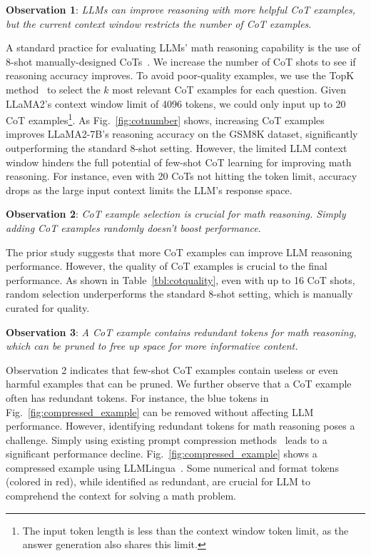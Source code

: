 \textbf{Observation 1}: \textit{LLMs can improve reasoning with more helpful CoT examples, but the current context window restricts the number of  CoT examples}.

A standard practice for evaluating LLMs' math reasoning capability is the use of 8-shot manually-designed CoTs~\cite{cot}. We increase the number of CoT shots to see if reasoning accuracy improves. To avoid poor-quality examples, we use the TopK method~\cite{topk} to select the $k$ most relevant CoT examples for each question. Given LLaMA2's context window limit of 4096 tokens, we could only input up to 20 CoT examples\footnote{The input token length is less than the context window token limit, as the answer generation also shares this limit. }. As Fig.~\ref{fig:cotnumber} shows, increasing CoT examples improves LLaMA2-7B's reasoning accuracy on the GSM8K dataset, significantly outperforming the standard 8-shot setting.  However, the limited LLM context window hinders the full potential of few-shot CoT learning for improving math reasoning. For instance, even with 20 CoTs not hitting the token limit, accuracy drops as the large input context limits the LLM's response space.

\textbf{Observation 2}: \textit{CoT example selection is crucial for math reasoning. Simply adding  CoT examples randomly doesn't boost performance}.

The prior study suggests that more CoT examples can improve LLM reasoning performance. However, the quality of CoT examples is crucial to the final performance. As shown in Table~\ref{tbl:cotquality}, even with up to 16 CoT shots, random selection underperforms the standard 8-shot setting, which is manually curated for quality. 

\textbf{Observation 3}: \textit{A CoT example contains redundant tokens for math reasoning, which can be pruned to free up space for more informative content.} 

Observation 2 indicates that few-shot CoT examples contain useless or even harmful examples that can be pruned. We further observe that a CoT example often has redundant tokens. For instance, the blue tokens in Fig.~\ref{fig:compressed_example} can be removed without affecting LLM performance. However, identifying redundant tokens for math reasoning poses a challenge. Simply using existing prompt compression methods~\cite{llmlingua,li2023compressing} leads to a significant performance decline. Fig.~\ref{fig:compressed_example} shows a compressed example using LLMLingua~\cite{llmlingua}. Some numerical and format tokens (colored in red), while identified as redundant, are crucial for LLM to comprehend the context for solving a math problem. 

